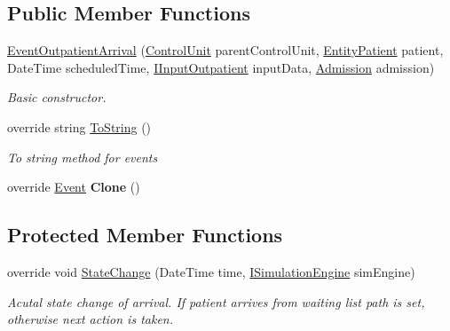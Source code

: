 \subsection*{Public Member Functions}
\begin{DoxyCompactItemize}
\item 
\hyperlink{class_general_health_care_elements_1_1_department_models_1_1_outpatient_1_1_event_outpatient_arrival_a5f9f49173e96c5102b516700f970ba1e}{Event\+Outpatient\+Arrival} (\hyperlink{class_simulation_core_1_1_h_c_c_m_elements_1_1_control_unit}{Control\+Unit} parent\+Control\+Unit, \hyperlink{class_general_health_care_elements_1_1_entities_1_1_entity_patient}{Entity\+Patient} patient, Date\+Time scheduled\+Time, \hyperlink{interface_general_health_care_elements_1_1_department_models_1_1_outpatient_1_1_i_input_outpatient}{I\+Input\+Outpatient} input\+Data, \hyperlink{class_general_health_care_elements_1_1_treatment_admission_types_1_1_admission}{Admission} admission)
\begin{DoxyCompactList}\small\item\em Basic constructor. \end{DoxyCompactList}\item 
override string \hyperlink{class_general_health_care_elements_1_1_department_models_1_1_outpatient_1_1_event_outpatient_arrival_a0a434fb9042926866a2c52cec87cb4dc}{To\+String} ()
\begin{DoxyCompactList}\small\item\em To string method for events \end{DoxyCompactList}\item 
override \hyperlink{class_simulation_core_1_1_h_c_c_m_elements_1_1_event}{Event} {\bfseries Clone} ()\hypertarget{class_general_health_care_elements_1_1_department_models_1_1_outpatient_1_1_event_outpatient_arrival_a42fa0477065240c6fff15f8efe30d7a6}{}\label{class_general_health_care_elements_1_1_department_models_1_1_outpatient_1_1_event_outpatient_arrival_a42fa0477065240c6fff15f8efe30d7a6}

\end{DoxyCompactItemize}
\subsection*{Protected Member Functions}
\begin{DoxyCompactItemize}
\item 
override void \hyperlink{class_general_health_care_elements_1_1_department_models_1_1_outpatient_1_1_event_outpatient_arrival_a5e187135f06879dab2d048b41e5831a4}{State\+Change} (Date\+Time time, \hyperlink{interface_simulation_core_1_1_simulation_classes_1_1_i_simulation_engine}{I\+Simulation\+Engine} sim\+Engine)
\begin{DoxyCompactList}\small\item\em Acutal state change of arrival. If patient arrives from waiting list path is set, otherwise next action is taken. \end{DoxyCompactList}\end{DoxyCompactItemize}

